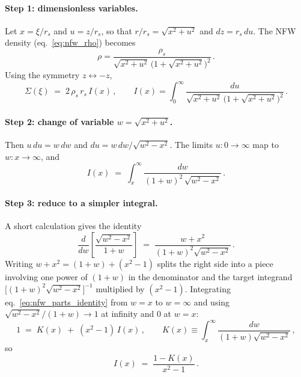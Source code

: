 \paragraph{Step 1: dimensionless variables.}
Let $x = \xi/r_s$ and $u = z/r_s$, so that $r/r_s = \sqrt{x^2+u^2}$ and
$dz = r_s\,du$.  The NFW density (eq.~\ref{eq:nfw_rho}) becomes
\begin{equation*}
    \rho = \frac{\rho_s}{\sqrt{x^2+u^2}\,\bigl(1 + \sqrt{x^2+u^2}\bigr)^2}\,.
\end{equation*}
Using the symmetry $z \leftrightarrow -z$,
\begin{equation}
    \Sigma(\xi) \;=\; 2\,\rho_s\,r_s\,I(x) \,,
    \qquad
    I(x) = \int_0^{\infty}\!
        \frac{du}{\sqrt{x^2+u^2}\,\bigl(1 + \sqrt{x^2+u^2}\bigr)^2}\,.
    \label{eq:nfw_I_definition}
\end{equation}

\paragraph{Step 2: change of variable $w = \sqrt{x^2+u^2}$.}
Then $u\,du = w\,dw$ and $du = w\,dw/\sqrt{w^2-x^2}$.  The limits
$u\!:\!0\to\infty$ map to $w\!:\!x\to\infty$, and
\begin{equation}
    I(x) \;=\; \int_{x}^{\infty}\!
        \frac{dw}{(1+w)^2\,\sqrt{w^2 - x^2}} \,.
    \label{eq:nfw_I_wform}
\end{equation}

\paragraph{Step 3: reduce to a simpler integral.}
A short calculation gives the identity
\begin{equation}
    \frac{d}{dw}\!\left[\frac{\sqrt{w^2-x^2}}{1+w}\right]
    \;=\;
    \frac{w + x^2}{(1+w)^2\sqrt{w^2-x^2}}\,.
    \label{eq:nfw_parts_identity}
\end{equation}
Writing $w + x^2 = (1+w) + (x^2 - 1)$ splits the right side into a
piece involving one power of $(1+w)$ in the denominator and the
target integrand $\bigl[(1+w)^2\sqrt{w^2-x^2}\bigr]^{-1}$ multiplied by
$(x^2-1)$.  Integrating eq.~\eqref{eq:nfw_parts_identity} from $w=x$ to
$w=\infty$ and using $\sqrt{w^2-x^2}/(1+w)\to 1$ at infinity and $0$ at
$w=x$:
\begin{equation}
    1 \;=\; K(x) \;+\; (x^2 - 1)\,I(x) \,,
    \qquad
    K(x) \equiv \int_x^{\infty}\!\frac{dw}{(1+w)\sqrt{w^2-x^2}}\,,
    \label{eq:nfw_IbK}
\end{equation}
so
\begin{equation}
    I(x) \;=\; \frac{1 - K(x)}{x^2 - 1}\,.
    \label{eq:nfw_I_as_K}
\end{equation}

